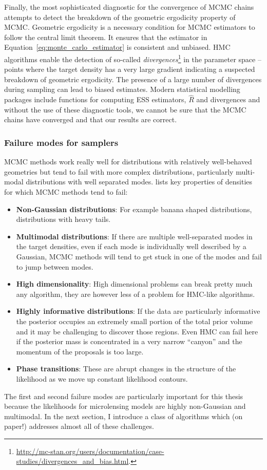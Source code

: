 \documentclass[12pt,dvipsnames]{report}
\begin{document}
Finally, the most sophisticated diagnostic for the convergence of MCMC chains
attempts to detect the breakdown of the geometric ergodicity property of
MCMC. Geometric ergodicity is a necessary condition for MCMC estimators to
follow the central limit theorem.
It ensures that the estimator in 
Equation~\ref{eq:monte_carlo_estimator} is consistent and unbiased.
HMC algorithms enable the detection of so-called
\emph{divergences}\footnote{\url{http://mc-stan.org/users/documentation/case-studies/divergences_and_bias.html}.}
 in the parameter space -- points 
where the target density has a very large gradient indicating 
a suspected  breakdown of geometric ergodicity.
The presence of a large number of divergences during sampling can lead to 
biased estimates. 
Modern statistical modelling packages include functions for computing ESS 
estimators,  $\hat R$ and divergences and without the use of these diagnostic 
tools, we cannot be sure that the MCMC chains have converged and that our results 
are correct.



\subsubsection{Failure modes for samplers}
MCMC methods work really well for distributions with relatively well-behaved 
geometries but tend to fail with more complex distributions, particularly 
multi-modal distributions with well separated modes. 
 \citet{arXiv:2101.09675} lists 
key properties of densities for which MCMC methods tend to fail:
\begin{itemize}
    \item \textbf{Non-Gaussian distributions}: For example banana shaped
    distributions, distributions with heavy tails.
    \item \textbf{Multimodal distributions}: If there are multiple well-separated
    modes in the target densities, even if each mode is individually 
    well described by a Gaussian, MCMC methods will tend to get stuck in one of
    the modes and fail to jump between modes.
    \item \textbf{High dimensionality}: High dimensional problems can break pretty 
    much any algorithm, they are however less of a problem for HMC-like algorithms.
    \item \textbf{Highly informative distributions}: If the data are particularly 
    informative the posterior occupies an extremely small portion of the total 
    prior volume and it may be challenging to discover those regions. Even HMC 
    can fail here if the posterior mass is concentrated  in a very narrow 
    ``canyon'' and the momentum of the proposals is too large.
    \item \textbf{Phase transitions}: These are abrupt changes in the structure 
    of the likelihood as we move up constant likelihood contours.
\end{itemize}
The first and second failure modes are particularly important for this thesis 
because the likelihoods for microlensing models are highly non-Gaussian and 
multimodal. In the next section, I introduce a class of algorithms which (on paper!)
addresses almost all of these challenges.
\end{document}

